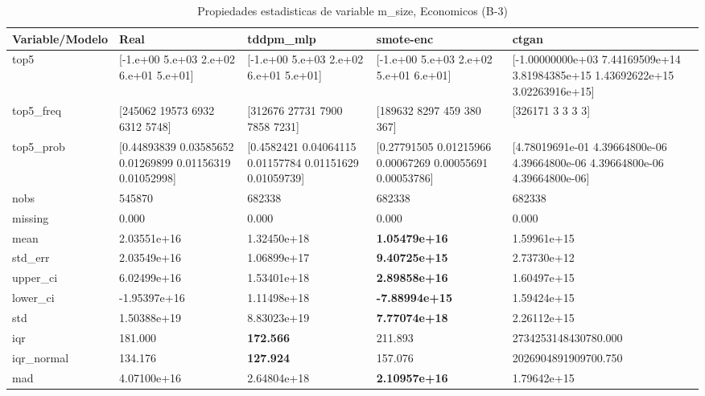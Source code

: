 \begin{table}[H]
\centering
\fontsize{8}{14}\selectfont
\caption{Propiedades  estadisticas de variable m\_size, Economicos (B-3)}
\label{table-stats-economicos-b-3-m_size}
\begin{tabular}{|l|m{10em}|m{10em}|m{10em}|m{10em}|}
\hline
 \rowcolor[gray]{0.8}
Variable/Modelo & Real & tddpm\_mlp & smote-enc & ctgan \\
\hline top5 & [-1.e+00  5.e+03  2.e+02  6.e+01  5.e+01] & [-1.e+00  5.e+03  2.e+02  6.e+01  5.e+01] & [-1.e+00  5.e+03  2.e+02  5.e+01  6.e+01] & [-1.00000000e+03  7.44169509e+14  3.81984385e+15  1.43692622e+15
  3.02263916e+15] \\
\hline top5\_freq & [245062  19573   6932   6312   5748] & [312676  27731   7900   7858   7231] & [189632   8297    459    380    367] & [326171      3      3      3      3] \\
\hline top5\_prob & [0.44893839 0.03585652 0.01269899 0.01156319 0.01052998] & [0.4582421  0.04064115 0.01157784 0.01151629 0.01059739] & [0.27791505 0.01215966 0.00067269 0.00055691 0.00053786] & [4.78019691e-01 4.39664800e-06 4.39664800e-06 4.39664800e-06
 4.39664800e-06] \\
\hline nobs & 545870 & 682338 & 682338 & 682338 \\
\hline missing & 0.000 & 0.000 & 0.000 & 0.000 \\
\hline mean & 2.03551e+16 & \cellcolor[rgb]{0.9, 0.54, 0.52} 1.32450e+18 & \bfseries 1.05479e+16 & 1.59961e+15 \\
\hline std\_err & 2.03549e+16 & \cellcolor[rgb]{0.9, 0.54, 0.52} 1.06899e+17 & \bfseries 9.40725e+15 & 2.73730e+12 \\
\hline upper\_ci & 6.02499e+16 & \cellcolor[rgb]{0.9, 0.54, 0.52} 1.53401e+18 & \bfseries 2.89858e+16 & 1.60497e+15 \\
\hline lower\_ci & -1.95397e+16 & \cellcolor[rgb]{0.9, 0.54, 0.52} 1.11498e+18 & \bfseries -7.88994e+15 & 1.59424e+15 \\
\hline std & 1.50388e+19 & \cellcolor[rgb]{0.9, 0.54, 0.52} 8.83023e+19 & \bfseries 7.77074e+18 & 2.26112e+15 \\
\hline iqr & 181.000 & \bfseries 172.566 & 211.893 & \cellcolor[rgb]{0.9, 0.54, 0.52} 2734253148430780.000 \\
\hline iqr\_normal & 134.176 & \bfseries 127.924 & 157.076 & \cellcolor[rgb]{0.9, 0.54, 0.52} 2026904891909700.750 \\
\hline mad & 4.07100e+16 & \cellcolor[rgb]{0.9, 0.54, 0.52} 2.64804e+18 & \bfseries 2.10957e+16 & 1.79642e+15 \\

\end{tabular}
\end{table}
